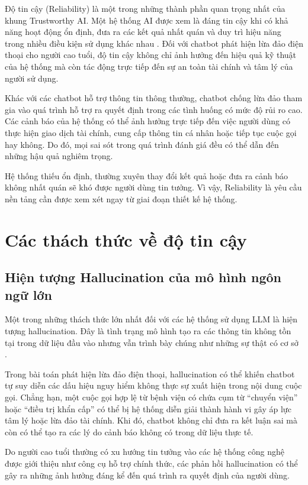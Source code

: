 Độ tin cậy (Reliability) là một trong những thành phần quan trọng nhất của khung Trustworthy AI. Một hệ thống AI được xem là đáng tin cậy khi có khả năng hoạt động ổn định, đưa ra các kết quả nhất quán và duy trì hiệu năng trong nhiều điều kiện sử dụng khác nhau \cite{nist_ai_rmf}. Đối với chatbot phát hiện lừa đảo điện thoại cho người cao tuổi, độ tin cậy không chỉ ảnh hưởng đến hiệu quả kỹ thuật của hệ thống mà còn tác động trực tiếp đến sự an toàn tài chính và tâm lý của người sử dụng.

Khác với các chatbot hỗ trợ thông tin thông thường, chatbot chống lừa đảo tham gia vào quá trình hỗ trợ ra quyết định trong các tình huống có mức độ rủi ro cao. Các cảnh báo của hệ thống có thể ảnh hưởng trực tiếp đến việc người dùng có thực hiện giao dịch tài chính, cung cấp thông tin cá nhân hoặc tiếp tục cuộc gọi hay không. Do đó, mọi sai sót trong quá trình đánh giá đều có thể dẫn đến những hậu quả nghiêm trọng.

Hệ thống thiếu ổn định, thường xuyên thay đổi kết quả hoặc đưa ra cảnh báo không nhất quán sẽ khó được người dùng tin tưởng. Vì vậy, Reliability là yêu cầu nền tảng cần được xem xét ngay từ giai đoạn thiết kế hệ thống.

\section{Các thách thức về độ tin cậy}
\subsection{Hiện tượng Hallucination của mô hình ngôn ngữ lớn}
Một trong những thách thức lớn nhất đối với các hệ thống sử dụng LLM là hiện tượng hallucination. Đây là tình trạng mô hình tạo ra các thông tin không tồn tại trong dữ liệu đầu vào nhưng vẫn trình bày chúng như những sự thật có cơ sở \cite{anhhoang2025_hallucination}.

Trong bài toán phát hiện lừa đảo điện thoại, hallucination có thể khiến chatbot tự suy diễn các dấu hiệu nguy hiểm không thực sự xuất hiện trong nội dung cuộc gọi. Chẳng hạn, một cuộc gọi hợp lệ từ bệnh viện có chứa cụm từ “chuyển viện” hoặc “điều trị khẩn cấp” có thể bị hệ thống diễn giải thành hành vi gây áp lực tâm lý hoặc lừa đảo tài chính. Khi đó, chatbot không chỉ đưa ra kết luận sai mà còn có thể tạo ra các lý do cảnh báo không có trong dữ liệu thực tế.

Do người cao tuổi thường có xu hướng tin tưởng vào các hệ thống công nghệ được giới thiệu như công cụ hỗ trợ chính thức, các phản hồi hallucination có thể gây ra những ảnh hưởng đáng kể đến quá trình ra quyết định của người dùng.

